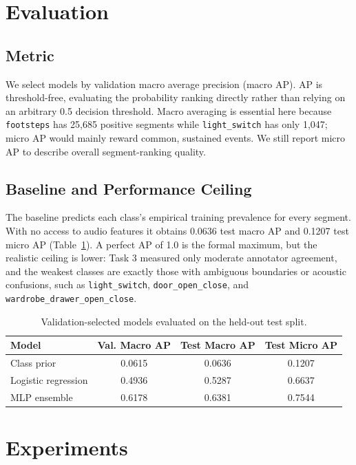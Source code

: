 \documentclass{article}
\begin{document}
\section{Evaluation}

\subsection{Metric}

We select models by validation macro average precision (macro AP). AP is threshold-free, evaluating the probability ranking directly rather than relying on an arbitrary 0.5 decision threshold. Macro averaging is essential here because \texttt{footsteps} has 25{,}685 positive segments while \texttt{light\_switch} has only 1{,}047; micro AP would mainly reward common, sustained events. We still report micro AP to describe overall segment-ranking quality.

\subsection{Baseline and Performance Ceiling}

The baseline predicts each class's empirical training prevalence for every segment. With no access to audio features it obtains 0.0636 test macro AP and 0.1207 test micro AP (Table~\ref{tab:final}). A perfect AP of 1.0 is the formal maximum, but the realistic ceiling is lower: Task 3 measured only moderate annotator agreement, and the weakest classes are exactly those with ambiguous boundaries or acoustic confusions, such as \texttt{light\_switch}, \texttt{door\_open\_close}, and \texttt{wardrobe\_drawer\_open\_close}.

\begin{table}[t]
  \centering
  \small
  \caption{Validation-selected models evaluated on the held-out test split.}
  \label{tab:final}
  \begin{tabular}{lccc}
    \toprule
    Model & Val. Macro AP & Test Macro AP & Test Micro AP \\
    \midrule
    Class prior & 0.0615 & 0.0636 & 0.1207 \\
    Logistic regression & 0.4936 & 0.5287 & 0.6637 \\
    MLP ensemble & 0.6178 & 0.6381 & 0.7544 \\
    \bottomrule
  \end{tabular}
\end{table}

\section{Experiments}
\end{document}
